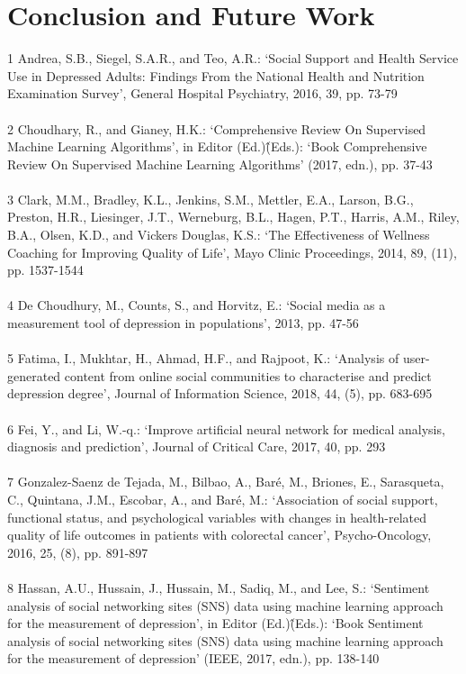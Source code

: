 \documentclass[runningheads]{llncs}
\begin{document}
\section{Conclusion and Future Work}
%
%
%
\pagebreak
\begin{thebibliography}{8}	
%	
1	Andrea, S.B., Siegel, S.A.R., and Teo, A.R.: ‘Social Support and Health Service Use in Depressed Adults: Findings From the National Health and Nutrition Examination Survey’, General Hospital Psychiatry, 2016, 39, pp. 73-79
\\\\
2	Choudhary, R., and Gianey, H.K.: ‘Comprehensive Review On Supervised Machine Learning Algorithms’, in Editor (Ed.)\^(Eds.): ‘Book Comprehensive Review On Supervised Machine Learning Algorithms’ (2017, edn.), pp. 37-43
\\\\
3	Clark, M.M., Bradley, K.L., Jenkins, S.M., Mettler, E.A., Larson, B.G., Preston, H.R., Liesinger, J.T., Werneburg, B.L., Hagen, P.T., Harris, A.M., Riley, B.A., Olsen, K.D., and Vickers Douglas, K.S.: ‘The Effectiveness of Wellness Coaching for Improving Quality of Life’, Mayo Clinic Proceedings, 2014, 89, (11), pp. 1537-1544
\\\\
4	De Choudhury, M., Counts, S., and Horvitz, E.: ‘Social media as a measurement tool of depression in populations’, 2013, pp. 47-56
\\\\
5	Fatima, I., Mukhtar, H., Ahmad, H.F., and Rajpoot, K.: ‘Analysis of user-generated content from online social communities to characterise and predict depression degree’, Journal of Information Science, 2018, 44, (5), pp. 683-695
\\\\
6	Fei, Y., and Li, W.-q.: ‘Improve artificial neural network for medical analysis, diagnosis and prediction’, Journal of Critical Care, 2017, 40, pp. 293
\\\\
7	Gonzalez-Saenz de Tejada, M., Bilbao, A., Baré, M., Briones, E., Sarasqueta, C., Quintana, J.M., Escobar, A., and Baré, M.: ‘Association of social support, functional status, and psychological variables with changes in health-related quality of life outcomes in patients with colorectal cancer’, Psycho-Oncology, 2016, 25, (8), pp. 891-897
\\\\
8	Hassan, A.U., Hussain, J., Hussain, M., Sadiq, M., and Lee, S.: ‘Sentiment analysis of social networking sites (SNS) data using machine learning approach for the measurement of depression’, in Editor (Ed.)\^(Eds.): ‘Book Sentiment analysis of social networking sites (SNS) data using machine learning approach for the measurement of depression’ (IEEE, 2017, edn.), pp. 138-140

\end{thebibliography}
\end{document}
